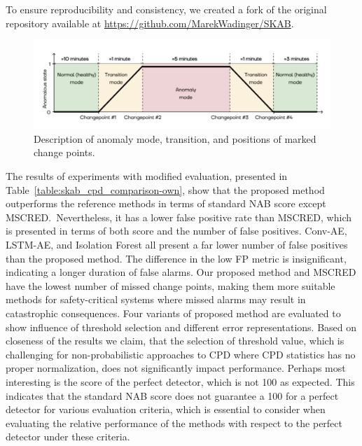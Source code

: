 To ensure reproducibility and consistency, we created a fork of the original repository available at \url{https://github.com/MarekWadinger/SKAB}.

\begin{figure}[H]
    \centering
    \includegraphics[width=\linewidth]{figures/scab-interpretation.png}
    \caption{Description of anomaly mode, transition, and positions of marked change points.}\label{fig:scab_interpretation}
\end{figure}

The results of experiments with modified evaluation, presented in Table~\ref{table:skab_cpd_comparison-own}, show that the proposed method outperforms the reference methods in terms of standard NAB score except MSCRED.~Nevertheless, it has a lower false positive rate than MSCRED, which is presented in terms of both score and the number of false positives. Conv-AE, LSTM-AE, and Isolation Forest all present a far lower number of false positives than the proposed method. The difference in the low FP metric is insignificant, indicating a longer duration of false alarms. Our proposed method and MSCRED have the lowest number of missed change points, making them more suitable methods for safety-critical systems where missed alarms may result in catastrophic consequences. Four variants of proposed method are evaluated to show influence of threshold selection and different error representations. Based on closeness of the results we claim, that the selection of threshold value, which is challenging for non-probabilistic approaches to CPD where CPD statistics has no proper normalization, does not significantly impact performance. Perhaps most interesting is the score of the perfect detector, which is not 100 as expected. This indicates that the standard NAB score does not guarantee a 100 for a perfect detector for various evaluation criteria, which is essential to consider when evaluating the relative performance of the methods with respect to the perfect detector under these criteria.

